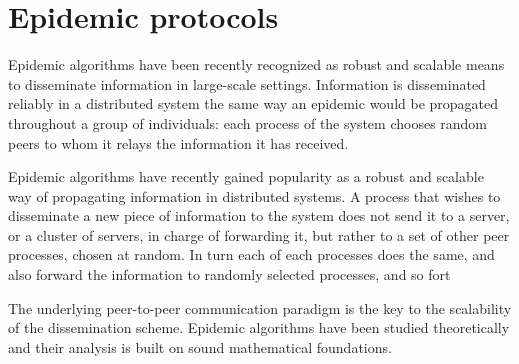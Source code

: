 \section{Epidemic protocols}
Epidemic algorithms have been recently recognized as robust and scalable means to disseminate information in large-scale settings. Information is disseminated reliably in a distributed system the same way an epidemic would be propagated throughout a group of individuals: each process of the system chooses random peers to whom it relays the information it has received.

Epidemic algorithms have recently gained popularity as a robust and scalable way of propagating information in distributed systems.
A process that wishes to disseminate a new piece of information to the system does not send it to a server, or a cluster of servers, in charge of forwarding it, but rather to a set of other peer processes, chosen at random. In turn each of each processes does the same, and also forward the information to randomly selected processes, and so fort

The underlying peer-to-peer communication paradigm is the key to the scalability of the dissemination scheme.
Epidemic algorithms have been studied theoretically and their analysis is built on sound mathematical foundations.

